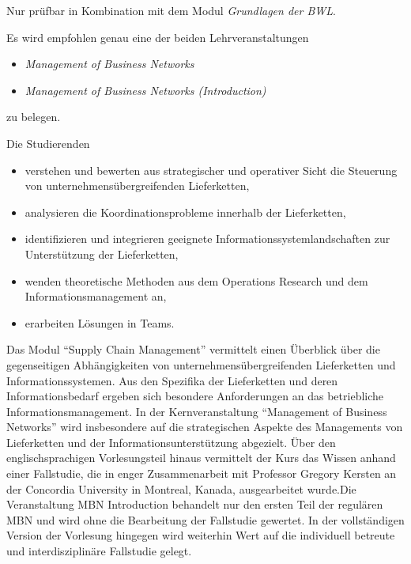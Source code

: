 \begin{module}
\begin{styleenv}
\begin{assessment}
\end{assessment}

\begin{conditions}Nur prüfbar in Kombination mit dem Modul \emph{Grundlagen der BWL}.

 \end{conditions}

\begin{recommendations}Es wird empfohlen genau eine der beiden Lehrveranstaltungen

 \begin{itemize}\item \emph{Management of Business Networks}  \item \emph{Management of Business Networks (Introduction)}  \end{itemize}

zu belegen.

\end{recommendations}
\end{styleenv}

\begin{learningoutcomes}
 

Die Studierenden

 \begin{itemize}\item verstehen und bewerten aus strategischer und operativer Sicht die Steuerung von unternehmensübergreifenden Lieferketten,  \item analysieren die Koordinationsprobleme innerhalb der Lieferketten,  \item identifizieren und integrieren geeignete Informationssystemlandschaften zur Unterstützung der Lieferketten,  \item wenden theoretische Methoden aus dem Operations Research und dem Informationsmanagement an,  \item erarbeiten Lösungen in Teams.  \end{itemize}
\end{learningoutcomes}

\begin{content}
Das Modul “Supply Chain Management” vermittelt einen Überblick über die gegenseitigen Abhängigkeiten von unternehmensübergreifenden Lieferketten und Informationssystemen. Aus den Spezifika der Lieferketten und deren Informationsbedarf ergeben sich besondere Anforderungen an das betriebliche Informationsmanagement. In der Kernveranstaltung “Management of Business Networks” wird insbesondere auf die strategischen Aspekte des Managements von Lieferketten und der Informationsunterstützung abgezielt. Über den englischsprachigen Vorlesungsteil hinaus vermittelt der Kurs das Wissen anhand einer Fallstudie, die in enger Zusammenarbeit mit Professor Gregory Kersten an der Concordia University in Montreal, Kanada, ausgearbeitet wurde.Die Veranstaltung MBN Introduction behandelt nur den ersten Teil der regulären MBN und wird ohne die Bearbeitung der Fallstudie gewertet. In der vollständigen Version der Vorlesung hingegen wird weiterhin Wert auf die individuell betreute und interdisziplinäre Fallstudie gelegt.


\end{content}
\end{module}
